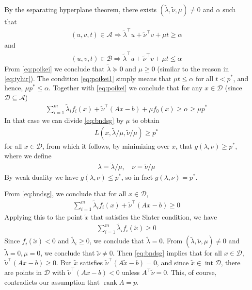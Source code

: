 \documentclass{article}
\newcommand{\inte}{\operatorname{int}}
\begin{document}
By the separating hyperplane theorem, there exists $(\tilde{\lambda}, \tilde{\nu}, \mu) \neq 0$ and $\alpha$ such that
\begin{align}
(u, v, t) \in \mathcal{A} \Longrightarrow \tilde{\lambda}^{\top} u+\tilde{\nu}^{\top} v+\mu t \geq \alpha\label{eq:poikei}
\end{align}
and
\begin{align}
(u, v, t) \in \mathcal{B} \Longrightarrow \tilde{\lambda}^{\top} u+\tilde{\nu}^{\top} v+\mu t \leq \alpha\label{eq:poikei1}
\end{align}
From \cref{eq:poikei} we conclude that $\tilde{\lambda} \succeq 0$ and $\mu \geq 0$ (similar to the reason in \cref{eq:iyhir}).
The condition \cref{eq:poikei1} simply means that $\mu t \leq \alpha$ for all $t<p^* $, and hence, $\mu p^*  \leq \alpha$. Together with \cref{eq:poikei} we conclude that for any $x \in \mathcal{D}$ (since $ \mathcal{D}\subseteq  \mathcal{A}$)
\begin{align}
\sum_{i=1}^{m} \tilde{\lambda}_{i} f_{i}(x)+\tilde{\nu}^{\top}(A x-b)+\mu f_{0}(x) \geq \alpha \geq \mu p^* \label{eq:bndsg}
\end{align}
 In that case we can divide \cref{eq:bndsg} by $\mu$ to obtain
\begin{align*}
L(x, \tilde{\lambda} / \mu, \tilde{\nu} / \mu) \geq p^* 
\end{align*}
for all $x \in \mathcal{D}$, from which it follows, by minimizing over $x$, that $g(\lambda, \nu) \geq p^* $, where we define
\begin{align*}
\lambda=\tilde{\lambda} / \mu, \quad \nu=\tilde{\nu} / \mu
\end{align*}
By weak duality we have $g(\lambda, \nu) \leq p^* $, so in fact $g(\lambda, \nu)=p^* $. 

 From \cref{eq:bndsg}, we conclude that for all $x \in \mathcal{D}$,
\begin{align*}
\sum_{i=1}^{m} \tilde{\lambda}_{i} f_{i}(x)+\tilde{\nu}^{\top}(A x-b) \geq 0
\end{align*}
Applying this to the point $\tilde{x}$ that satisfies the Slater condition, we have
\begin{align*}
\sum_{i=1}^{m} \tilde{\lambda}_{i} f_{i}(\tilde{x}) \geq 0
\end{align*}
Since $f_{i}(\tilde{x})<0$ and $\tilde{\lambda}_{i} \geq 0$, we conclude that $\tilde{\lambda}=0 .$ From $(\tilde{\lambda}, \tilde{\nu}, \mu) \neq 0$ and $\tilde{\lambda}=0, \mu=0$, we conclude that $\tilde{\nu} \neq 0$. Then \cref{eq:bndsg} implies that for all $x \in \mathcal{D}$, $\tilde{\nu}^{\top}(A x-b) \geq 0 .$ But $\tilde{x}$ satisfies $\tilde{\nu}^{\top}(A \tilde{x}-b)=0$, and since $\tilde{x} \in\inte \mathcal{D}$, there are points in $\mathcal{D}$ with $\tilde{\nu}^{\top}(A x-b)<0$ unless $A^{\top} \tilde{\nu}=0$. This, of course, contradicts our assumption that $\operatorname{rank} A=p$.
\end{document}
